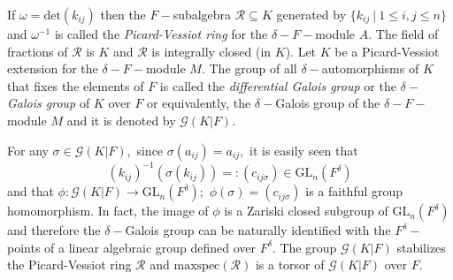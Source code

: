 \documentclass[preprint, 11pt]{amsart}
\theoremstyle{corollary}
\theoremstyle{remark}
\theoremstyle{proposition}
\numberwithin{equation}{subsection}
\begin{document}
If $\omega=\mathrm{det}(k_{ij})$ then the $F-$subalgebra $\mathscr R\subseteq K$ generated by $\{k_{ij}\ | \ 1\leq i, j\leq n\}$ and $\omega^{-1}$ is called the \emph{Picard-Vessiot ring}  for the $\delta-F-$module $A.$ The field of fractions of $\mathscr R$ is $K$ and $\mathscr R$ is integrally closed (in $K$).
Let  $K$ be a Picard-Vessiot extension for the  $\delta-F-$module $M.$
The group of all  $\delta-$automorphisms of $K$ that fixes the elements of $F$ is called the \emph{differential Galois group} or the \emph{$\delta-$Galois group} of $K$ over $F$ or equivalently, the $\delta-$Galois group  of the $\delta-F-$module $M$ and it is denoted by $\mathscr{G}(K|F).$

 For any $\sigma\in \mathscr{G}(K|F),$ since $\sigma(a_{ij})=a_{ij},$ it is easily seen that $$(k_{ij})^{-1}(\sigma(k_{ij}))=:(c_{ij\sigma})\in\mathrm{GL}_n(F^{\delta})$$ and that $\phi: \mathscr{G}(K|F)\to\mathrm{GL}_n(F^{\delta});$ $\phi(\sigma)= (c_{ij\sigma})$ is a faithful group homomorphism. In fact, the image of $\phi$ is a Zariski closed subgroup of $\mathrm{GL}_n(F^{\delta})$ and  therefore the $\delta-$Galois group can be naturally  identified with the $F^{\delta}-$points of a linear algebraic group defined over $F^{\delta}.$ The group $\mathscr G(K|F)$ stabilizes the  Picard-Vessiot ring $\mathscr R$ and $\mathrm{maxspec}(\mathscr R)$ is a torsor of $\mathscr G(K|F)$ over $F.$
\end{document}
